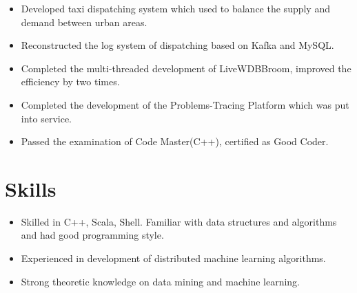 \documentclass{resume}
\begin{document}
\begin{itemize}
  \item Developed taxi dispatching system which used to balance the supply and demand between urban areas.
  \item Reconstructed the log system of dispatching based on Kafka and MySQL.
\end{itemize}

\begin{itemize}
  \item Completed the multi-threaded development of LiveWDBBroom, improved the efficiency by two times.
  \item Completed the development of the Problems-Tracing Platform which was put into service.
  \item Passed the examination of Code Master(C++), certified as Good Coder.
\end{itemize}

\section{\bf Skills}
\begin{itemize}
  \item Skilled in C++, Scala, Shell. Familiar with data structures and algorithms and had good programming style.
  \item Experienced in development of distributed machine learning algorithms.
  \item Strong theoretic knowledge on data mining and machine learning.
\end{itemize}
\end{document}

